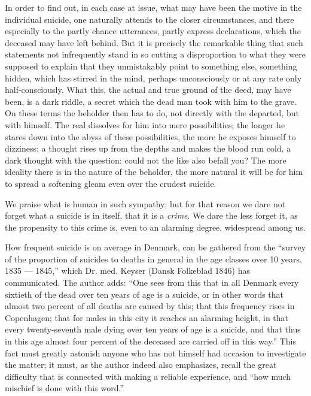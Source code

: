 \documentclass[12pt,a4paper,openany]{book}
\newcommand{\opage}[1]{\marginnote{\footnotesize\textit{[#1]}}}
\begin{document}
\setcounter{footnote}{0}%
\opage{690}In order to find out, in each case at issue, what may have been the motive in the individual suicide, one naturally attends to the closer circumstances, and there especially to the partly chance utterances, partly express declarations, which the deceased may have left behind. But it is precisely the remarkable thing that such statements not infrequently stand in so cutting a disproportion to what they were supposed to explain that they unmistakably point to something else, something hidden, which has stirred in the mind, perhaps unconsciously or at any rate only half-consciously. What this, the actual and true ground of the deed, may have been, is a dark riddle, a secret which the dead man took with him to the grave. On these terms the beholder then has to do, not directly with the departed, but with himself. The real dissolves for him into mere possibilities; the longer he stares down into the abyss of these possibilities, the more he exposes himself to dizziness; a thought rises up from the depths and makes the blood run cold, a dark thought with the question: could not the like also befall you? The more ideality there is in the nature of the beholder, the more natural it will be for him to spread a softening gleam even over the crudest suicide.

We praise what is human in such sympathy; but for that reason we dare not forget what a suicide is in itself, that it is a \emph{crime}. We dare the less forget it, as the propensity to this crime is, even to an alarming degree, widespread among us.

How frequent suicide is on average in Denmark, can be gathered from the ``survey of the proportion of
\setcounter{footnote}{0}%
\opage{691}suicides to deaths in general in the age classes over 10 years, 1835 --- 1845,'' which Dr. med. Keyser (Dansk Folkeblad 1846) has communicated. The author adds: ``One sees from this that in all Denmark every sixtieth %
of the dead over ten years of age is a suicide, or in other words that almost two percent of all deaths are caused by this; that this frequency rises in Copenhagen; that for males in this city it reaches an alarming height, in that every twenty-seventh male dying over ten years of age is a suicide, and that thus in this age almost four percent of the deceased are carried off in this way.'' This fact must greatly astonish anyone who has not himself had occasion to investigate the matter; it must, as the author indeed also emphasizes, recall the great difficulty that is connected with making a reliable experience, and ``how much mischief is done with this word.''
\end{document}
